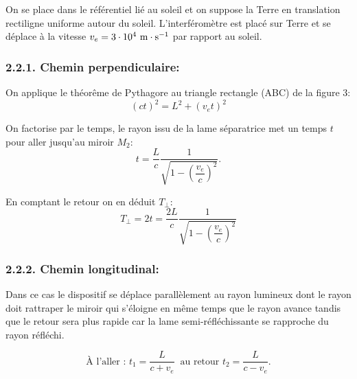 \documentclass[french, a4paper, 10pt, twocolumn, landscape]{article}
\begin{document}
On se place dans le référentiel lié au soleil et on suppose la Terre en translation rectiligne uniforme autour du soleil. L'interféromètre est placé sur Terre et se déplace à la vitesse $v_e = 3\cdot 10^4 ~\rm m\cdot s^{-1}$ par rapport au soleil. 

\subsubsection*{2.2.1. Chemin perpendiculaire:}


On applique le théorême de Pythagore au triangle rectangle (ABC) de la figure 3:
\begin{equation}
	(ct)^2=L^2+(v_et)^2 \nonumber
\end{equation}

On factorise par le temps, le rayon issu de la lame séparatrice met un temps $t$ pour aller jusqu'au miroir $M_2$: 
\begin{equation}
	t=\dfrac{L}{c}\dfrac{1}{\sqrt{1-\left(\dfrac{v_e}{c}\right)^2}}. \nonumber
\end{equation}

En comptant le retour on en déduit $T_\perp$:
\begin{equation}
	T_\perp=2t=\dfrac{2L}{c}\dfrac{1}{\sqrt{1-\left(\dfrac{v_e}{c}\right)^2}}
\end{equation}

\subsubsection*{2.2.2. Chemin longitudinal:}


Dans ce cas le dispositif se déplace parallèlement au rayon lumineux dont le rayon doit rattraper le miroir qui s'éloigne en même temps que le rayon avance tandis que le retour sera plus rapide car la lame semi-réfléchissante se rapproche du rayon réfléchi.

\begin{equation}
	\text{À l'aller : } t_{1} = \dfrac{L}{c+v_e}~\text{ au retour } t_2=\dfrac{L}{c-v_e}.\nonumber
\end{equation}
\end{document}
